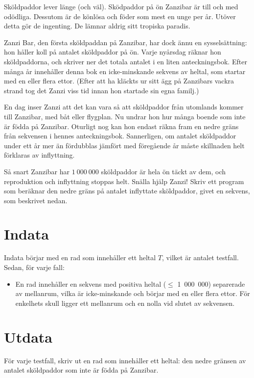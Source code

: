 


Sköldpaddor lever länge (och väl). Sködpaddor på ön Zanzibar
är till och med odödliga. Dessutom är de könlösa och föder som
mest en unge per år.
Utöver detta gör de ingenting. De lämnar aldrig sitt tropiska
paradis.

Zanzi Bar, den första sköldpaddan på Zanzibar, har dock ännu
en sysselsättning: hon håller koll på antalet sköldpaddor på
ön. Varje nyårsdag räknar hon sköldpaddorna, och skriver ner
det totala antalet i en liten anteckningsbok. Efter många år
innehåller denna bok en icke-minskande sekvens av heltal, som
startar med en eller flera ettor. (Efter att ha kläckts ur
sitt ägg på Zanzibars vackra strand tog det Zanzi viss tid
innan hon startade sin egna familj.)

En dag inser Zanzi att det kan vara så att sköldpaddor från
utomlands kommer till Zanzibar, med båt eller flygplan. Nu
undrar hon hur många boende som inte är födda på Zanzibar.
Oturligt nog kan hon endast räkna fram en nedre gräns från
sekvensen i hennes anteckningsbok. Sannerligen, om antalet
sköldpaddor under ett år mer än fördubblas jämfört med 
föregående år måste skillnaden helt förklaras av inflyttning.

Så snart Zanzibar har $1~000~000$ sköldpaddor är hela ön täckt
av dem, och reproduktion och inflyttning stoppas helt.
Snälla hjälp Zanzi! Skriv ett program som beräknar den nedre
gräns på antalet inflyttate sköldpaddor, givet en sekvens,
som beskrivet nedan.

\section*{Indata}
	Indata börjar med en rad som innehåller ett heltal $T$,
  vilket är antalet testfall. Sedan, för varje fall:
  
	\begin{itemize}
		\item En rad innehåller en sekvens med positiva 
    heltal ($\leq$ 1~000~000) separerade av mellanrum, 
    vilka är icke-minskande och börjar med en eller 
    flera ettor. För enkelhets skull ligger ett
    mellanrum och en nolla vid slutet av sekvensen.
	\end{itemize}
 


\section*{Utdata}
	För varje testfall, skriv ut en rad som innehåller 
  ett heltal: den nedre gränsen av antalet sköldpaddor
  som inte är födda på Zanzibar.
